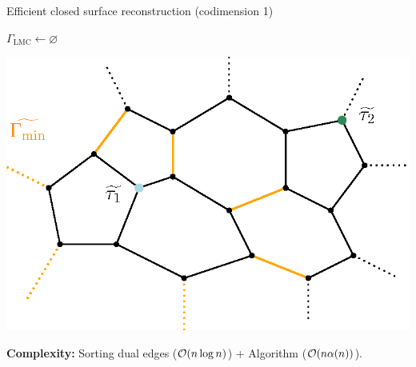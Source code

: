 \begin{frame}[c]{Efficient closed surface reconstruction (codimension 1)}
	\scriptsize
	\begin{minipage}[c]{0.5\linewidth}
		\begin{algorithm}[H]
			\alert<+|handout:0>{$\Gamma_{\operatorname{LMC}} \leftarrow \varnothing$} \\
			\alert<+|handout:0>{ {
			}}
			
		\end{algorithm}
	\end{minipage}%
	\begin{minipage}[c]{0.5\linewidth}
		\includegraphics[width=\linewidth]{dual/dual_problem}
	\end{minipage}%

	\textbf{Complexity:} Sorting dual edges ($\mathcal{O}(n \log n)$) + Algorithm ($\mathcal{O}(n \alpha(n))$).
\end{frame}

